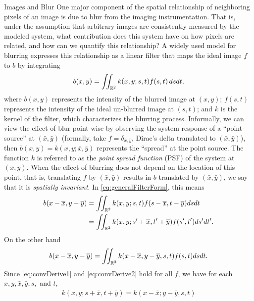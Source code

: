 \begin{chapter}{Images and Blur}
  One major component of the spatial relationship of neighboring pixels of an image is due to blur from the imaging instrumentation.
  That is, under the assumption that arbitrary images are consistently measured by the modeled system, what contribution does this system have on how pixels are related, and how can we quantify this relationship?
  A widely used model for blurring \citep{hansen2010,jain1989,vogel2002,epstein2008} expresses this relationship as a linear filter that maps the ideal image $f$ to $b$ by integrating
\begin{equation}\label{eq:generalFilterForm}
  b(x,y) = \iint_{\mathbb R^2} k(x,y;s,t) f(s,t)\,dsdt,
\end{equation}
  where $b(x,y)$ represents the intensity of the blurred image at $(x,y)$; $f(s,t)$ represents the intensity of the ideal un-blurred image at $(s,t)$; and $k$ is the kernel of the filter, which characterizes the blurring process.
  Informally, we can view the effect of blur point-wise by observing the system response of a ``point-source'' at $(\bar x,\bar y)$ (formally, take $f = \delta_{\bar x,\bar y}$, Dirac's delta translated to $(\bar x,\bar y)$), then $b(x,y) = k(x,y;\bar x,\bar y)$ represents the ``spread'' at the point source.
  The function $k$ is referred to as the \emph{point spread function} (PSF) of the system at $(\bar x,\bar y)$.
  When the effect of blurring does not depend on the location of this point, that is, translating $f$ by $(\bar x, \bar y)$ results in $b$ translated by $(\bar x,\bar y)$, we say that it is \emph{spatially invariant}. 
  In \eqref{eq:generalFilterForm}, this means
\begin{align} 
  b(x-\overline x,y-\overline y) 
  &= \iint_{\mathbb R^2} k(x,y;s,t) f(s-\overline x,t - \overline y)dsdt \nonumber\\
  &= \iint_{\mathbb R^2} k(x,y;s'+\overline x,t'+\overline y) f(s',t')ds'dt'.\label{eq:convDerive1}
\end{align}
  On the other hand
\begin{equation} \label{eq:convDerive2}
  b(x-\overline x,y-\overline y) = \iint_{\mathbb R^2} k(x-\overline x,y-\overline y,s,t) f(s,t)dsdt. 
\end{equation}
  Since \eqref{eq:convDerive1} and \eqref{eq:convDerive2} hold for all $f$, we have for each $x,y,\bar x, \bar y,s,$ and $t$,
\begin{align} 
 k(x,y;s+\bar x,t+\bar y) = k(x-\bar x;y-\bar y,s,t) 
\end{align}

\end{chapter}
